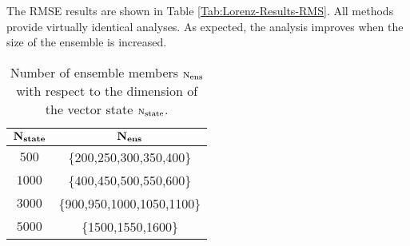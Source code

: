 \documentclass[12pt]{article}
\newcommand{\Nens}{\textsc{n}_{{\rm ens}}}
\newcommand{\Nstate}{\textsc{n}_{{\rm state}}}
\begin{document}
The RMSE results are shown in Table  \ref{Tab:Lorenz-Results-RMS}.
All methods provide virtually identical analyses. As expected, the analysis improves when the size of the ensemble is increased. 

\begin{table}[H]
\centering
{
\begin{tabular}{|c|c|} \hline
${\bf {N_{state}}}$ &  ${\bf {N_{ens}}}$ \\ \hline
$500$ & \{200,250,300,350,400\} \\ \hline
$1000$ & \{400,450,500,550,600\} \\ \hline
$3000$ & \{900,950,1000,1050,1100\} \\ \hline
$5000$ & \{1500,1550,1600\} \\ \hline
\end{tabular}
}
\caption{Number of ensemble members $\Nens$ with respect to the dimension of the vector state $\Nstate$.}
\label{Tab:Experimental-Settings-Nens}
\end{table}
\end{document}
